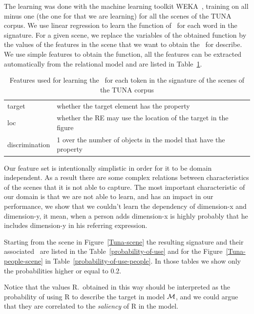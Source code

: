 The learning was done with the machine learning toolkit WEKA~\cite{Hall:WEK09}, training on all minus one (the one for that we are learning) for all the scenes of the TUNA corpus. We use linear regression to learn the function of \puse\ for each word in the signature. 
For a given scene, we replace the variables of the obtained function by the values of the features in the scene that we want to obtain the \puse\ for describe. 
We use simple features to obtain the function, all the features can be extracted automatically from the relational model and are listed 
in Table~\ref{features}.  

\begin{table}[htbp]
\begin{center}
\begin{tabular}{|l|p{10cm}|}
\hline
target & whether the target element has the property \\
loc & whether the RE may use the location of the target in the figure\\
discrimination & 1 over the number of objects in the model that have the property \\
\hline
\end{tabular}
\vspace*{.03cm}
\caption{Features used for learning the \puse ~for each token in the signature of the scenes of the TUNA corpus} 
\label{features}
\end{center}
\end{table}
\vspace*{-.9cm}
Our feature set is intentionally simplistic in order for it to be domain independent. As a result there are some complex relations 
between characteristics of the scenes that it is not able to capture. The most important characteristic of our domain is that we are not able 
to learn, and has an impact in our performance, we show that we couldn't learn the dependency of dimension-x and dimension-y, it mean, when a person adds dimension-x is highly probably that he includes dimension-y in his referring expression. 

Starting from the scene in Figure~\ref{Tuna-scene}
the resulting signature and their associated \puse\ are listed in the Table~\ref{probability-of-use} and for the Figure~\ref{Tuna-people-scene} in Table~\ref{probability-of-use-people}. In those tables we show only the probabilities higher or equal to 0.2.

Notice that the values R.\puse\ obtained in this way should be interpreted as the probability of using R to describe the target in model 
$\mathcal{M}$, and we could argue that they are correlated to the \emph{saliency} of R in the model.  


